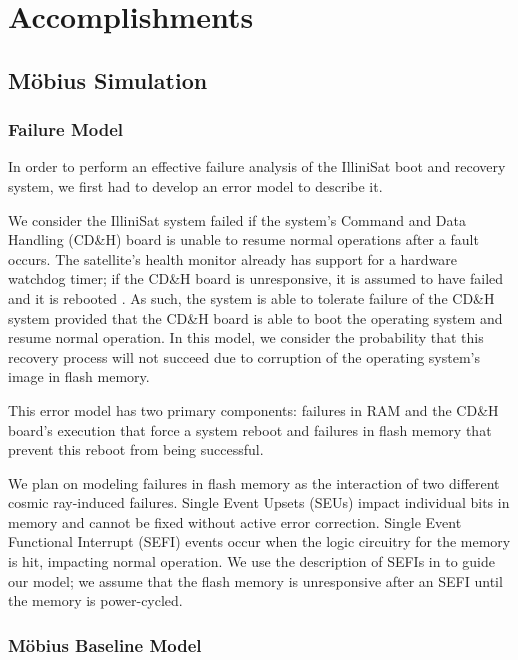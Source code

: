 \section{Accomplishments}

\subsection{M\"obius Simulation}

\subsubsection{Failure Model}

In order to perform an effective failure analysis of the IlliniSat boot and recovery system, we first had to develop an error model to describe it.

We consider the IlliniSat system failed if the system's Command and Data Handling (CD\&H) board is unable to resume normal operations after a fault occurs.  The satellite's health monitor already has support for a hardware watchdog timer; if the CD\&H board is unresponsive, it is assumed to have failed and it is rebooted \cite{jagannatha2014command}.  As such, the system is able to tolerate failure of the CD\&H system provided that the CD\&H board is able to boot the operating system and resume normal operation.  In this model, we consider the probability that this recovery process will not succeed due to corruption of the operating system's image in flash memory.

This error model has two primary components: failures in RAM and the CD\&H board's execution that force a system reboot and failures in flash memory that prevent this reboot from being successful.

We plan on modeling failures in flash memory as the interaction of two different cosmic ray-induced failures.  Single Event Upsets (SEUs) impact individual bits in memory and cannot be fixed without active error correction.  Single Event Functional Interrupt (SEFI) events occur when the logic circuitry for the memory is hit, impacting normal operation.  We use the description of SEFIs in \cite{Gerardin2010Present} to guide our model; we assume that the flash memory is unresponsive after an SEFI until the memory is power-cycled.

\subsubsection{M\"obius Baseline Model}

